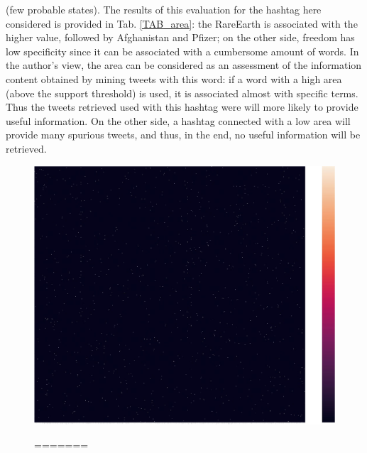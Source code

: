 \documentclass[12pt,%
               a4paper,%
               oneside,openany,%
               titlepage,%
               headinclude,footinclude,%
               BCOR5mm,%
               cleardoublepage=empty,%
               tablecaptionabove,%
               floatperchapter,
               ]{scrreprt}                 %
\begin{document}
(few probable states). The results of this evaluation for the hashtag here considered is provided in Tab. \ref{TAB_area}: the RareEarth is associated with the higher value, followed by Afghanistan and Pfizer; on the other side, freedom has low specificity since it can be associated with a cumbersome amount of words. In the author's view, the area can be considered as an assessment of the information content obtained by mining tweets with this word: if a word with a high area (above the support threshold) is used, it is associated almost with specific terms. Thus the tweets retrieved used with this hashtag were will more likely to provide useful information. On the other side, a hashtag connected with a low area will provide many spurious tweets, and thus, in the end, no useful information will be retrieved.


\begin{figure}[ht]
\begin{minipage}[b]{0.5\linewidth}
    \centering
    \includegraphics[width=.9\linewidth]{Figures/Matrix_rareearth.jpg}
    \vspace{4ex}
  \end{minipage}
\begin{minipage}[b]{0.5\linewidth}
=======

\end{minipage}
\end{figure}
\end{document}
